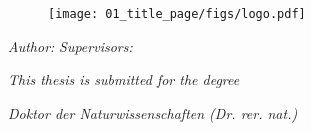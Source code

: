 


\begin{titlepage}
  \thispagestyle{empty}

  \begin{center}
    {\large \theUniversity{}}
    \par {\large \theFaculty{}}
    \par {\large \theDepartment{}}


    \begin{figure}[h]
      \centering
      \texttt{[image: 01\_title\_page/figs/logo.pdf]}
    \end{figure}

    {\huge \textsf{\textbf{\theTitle{}}}}

    \vspace{10mm}

    {\Large \textsf{\textbf{\theThesis{}}}}

    \vspace{15mm}

    \textit{Author:} \hfill \textit{Supervisors:}
    \par {\large \theAuthor{} \hfill \theFirstSupervisor{}}
    \par {\large \hfill \theSecondSupervisor{}}

    \vspace{15mm}

    \textit{This thesis is submitted for the degree}
    \par \textit{Doktor der Naturwissenschaften (Dr. rer. nat.)}

    \vspace{15mm}

    \theDate{}
  \end{center}
\end{titlepage}